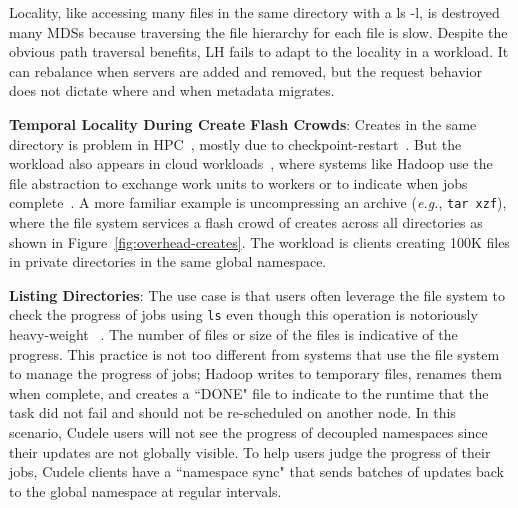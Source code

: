 Locality, like accessing many files in the same directory with a ls -l, is
destroyed many MDSs because traversing the file hierarchy for each file is
slow. Despite the obvious path traversal benefits, LH fails to adapt to the
locality in a workload. It can rebalance when servers are added and removed,
but the request behavior does not dictate where and when metadata migrates.

\textbf{Temporal Locality During Create Flash Crowds}: Creates in the same
directory is problem in HPC~\cite{weil:sc2004-dyn-metadata, ren:sc2014-indexfs,
patil:fast2011-giga, zheng:pdsw2014-batchfs, sevilla:sc15-mantle}, mostly due
to checkpoint-restart~\cite{bent_plfs_2009}.  But the workload also appears in
cloud workloads~\cite{xiao:socc15-shardfs}, where systems like Hadoop use the
file abstraction to exchange work units to workers or to indicate when jobs
complete~\cite{shvachko:login2012-hdfs-scalability}. A more familiar example is
uncompressing an archive ({\it e.g.}, \texttt{tar xzf}), where the file system
services a flash crowd of creates across all directories as shown in
Figure~\ref{fig:overhead-creates}.  The workload is clients creating 100K files
in private directories in the same global namespace.


\textbf{Listing Directories}:
The use case is that users often leverage the file system to check the progress
of jobs using \texttt{ls} even though this operation is notoriously
heavy-weight~\cite{carns:ipdps09-pvfs, eshel:fast10-panache} . The number of
files or size of the files is indicative of the progress. This practice is not
too different from systems that use the file system to manage the progress of
jobs; Hadoop writes to temporary files, renames them when complete, and creates
a ``DONE" file to indicate to the runtime that the task did not fail and should
not be re-scheduled on another node. In this scenario, Cudele users will not
see the progress of decoupled namespaces since their updates are not globally
visible.  To help users judge the progress of their jobs, Cudele clients have a
``namespace sync" that sends batches of updates back to the global namespace at
regular intervals.

